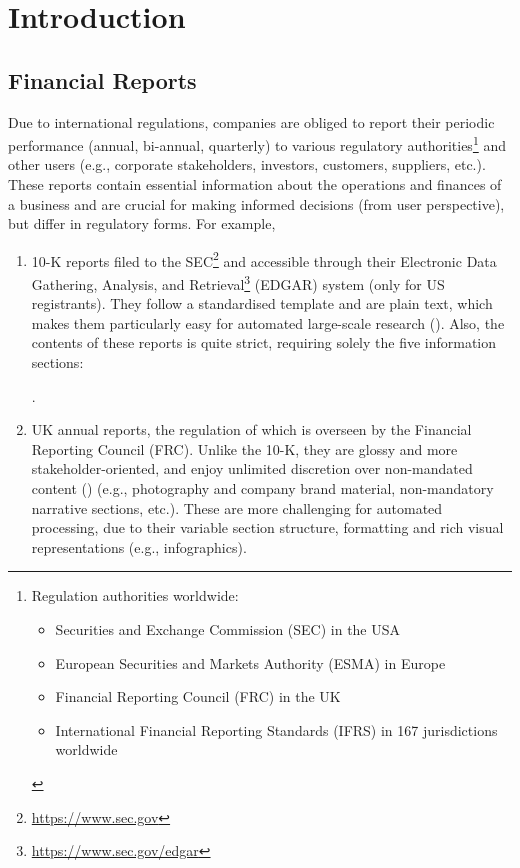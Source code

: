 \section{Introduction}\label{sec:introduction}

\subsection{Financial Reports}\label{subsec:financial-reports}
Due to international regulations, companies are obliged to report their periodic performance (annual, bi-annual, quarterly) to various regulatory authorities\footnote{Regulation authorities worldwide:
\begin{itemize}
    \item Securities and Exchange Commission (SEC) in the USA
    \item European Securities and Markets Authority (ESMA) in Europe
    \item Financial Reporting Council (FRC) in the UK
    \item International Financial Reporting Standards (IFRS) in 167 jurisdictions worldwide
\end{itemize}
} and other users (e.g., corporate stakeholders, investors, customers, suppliers, etc.).
These reports contain essential information about the operations and finances of a business and are crucial for making informed decisions (from user perspective), but differ in regulatory forms.
For example,
\begin{enumerate}
    \item 10-K reports filed to the SEC\footnote{\url{https://www.sec.gov}} and accessible through their Electronic Data Gathering, Analysis, and Retrieval\footnote{\url{https://www.sec.gov/edgar}} (EDGAR) system (only for US registrants).
    They follow a standardised template and are plain text, which makes them particularly easy for automated large-scale research (\cite{el-haj2019retrieving}).
    Also, the contents of these reports is quite strict, requiring solely the five information sections:
.
    \item UK annual reports, the regulation of which is overseen by the Financial Reporting Council (FRC).
    Unlike the 10-K, they are glossy and more stakeholder-oriented, and enjoy unlimited discretion over non-mandated content (\cite{el-haj2019retrieving}) (e.g., photography and company brand material, non-mandatory narrative sections, etc.).
    These are more challenging for automated processing, due to their variable section structure, formatting and rich visual representations (e.g., infographics).
\end{enumerate}
